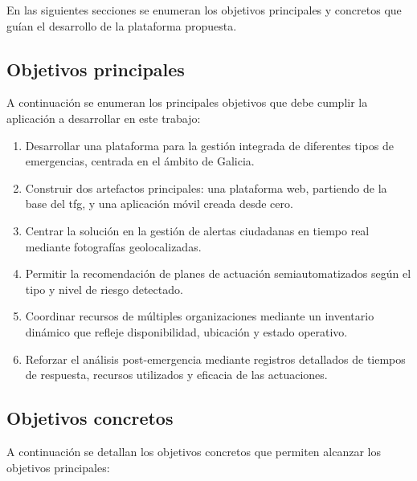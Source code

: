 En las siguientes secciones se enumeran los objetivos principales y concretos que guían el desarrollo de la plataforma propuesta. 

\subsection{Objetivos principales}

A continuación se enumeran los principales objetivos que debe cumplir la aplicación a desarrollar en este trabajo:

\begin{enumerate}
    \item Desarrollar una plataforma para la gestión integrada de diferentes tipos de emergencias, centrada en el ámbito de Galicia.
    \item Construir dos artefactos principales: una plataforma web, partiendo de la base del \acrshort{tfg}, y una aplicación móvil creada desde cero.
    \item Centrar la solución en la gestión de alertas ciudadanas en tiempo real mediante fotografías geolocalizadas.
    \item Permitir la recomendación de planes de actuación semiautomatizados según el tipo y nivel de riesgo detectado.
    \item Coordinar recursos de múltiples organizaciones mediante un inventario dinámico que refleje disponibilidad, ubicación y estado operativo.
    \item Reforzar el análisis post-emergencia mediante registros detallados de tiempos de respuesta, recursos utilizados y eficacia de las actuaciones.
\end{enumerate}


\subsection{Objetivos concretos}

A continuación se detallan los objetivos concretos que permiten alcanzar los objetivos principales:

